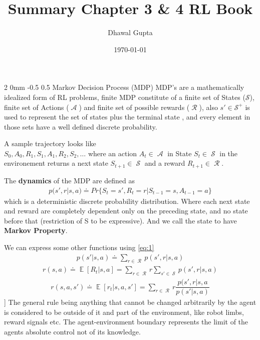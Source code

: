 \documentclass[twocolumn,11pt]{article}
\title{Summary Chapter 3 \& 4 RL Book \cite{sutton2018reinforcement}}
\author{Dhawal Gupta}
\date{\today}
\makeatletter
\DeclareMathOperator{\E}{\mathbb{E}}
\DeclareMathOperator{\State}{\mathcal{S}}
\DeclareMathOperator{\Action}{\mathcal{A}}
\DeclareMathOperator{\Reward}{\mathcal{R}}
\renewcommand{\section}{\@startsection
{section}%
{2}%
{0mm}%
{-0.5\baselineskip}%
{0.5\baselineskip}%
{\bfseries\color{blue}}} %
\makeatother
\begin{document}
\maketitle

\section{Markov Decision Process (MDP)}
MDP's are a mathematically idealized form of RL problems, finite MDP constitute of a finite set of States ($\mathcal{S}$),  finite set of Actions ($\Action$) and finite set of possible rewards ($\Reward$), also $s' \in \mathcal{S}^+$ is used to represent the set of states plus the terminal state , and every element in those sets have a well defined discrete probability. 

A sample trajectory looks like\\
$S_0, A_0, R_1, S_1, A_1, R_2, S_2, \ldots$ where an action $A_t \in \Action$ in State $S_t \in  \State$ in the environement returns a next state $S_{t+1} \in \State$ and a reward $R_{t+1} \in \Reward$.

The \textbf{dynamics} of the MDP are defined as 
\begin{align}\label{eq:1}
    p(s',r|s,a) \doteq Pr\{S_t= s', R_t = r | S_{t-1} = s, A_{t-1} = a\}
\end{align}
which is a deterministic discrete probability distribution. Where each next state and reward are completely dependent only on the preceding state, and no state before that (restriction of S to be expressive). And we call the state to have \textbf{Markov Property}. 

We can express some other functions using \ref{eq:1}\useshortskip
\begin{align}\label{eq:2}
    p(s'|s,a) \doteq \sum_{r \in \Reward}p(s', r|s, a)
\end{align}\useshortskip
\begin{align}\label{eq:3}
    r(s,a) \doteq \E[R_t | s, a] = \sum_{r \in \Reward} r \sum_{s' \in \State} p(s',r|s,a)
\end{align}\useshortskip
\begin{align}\label{eq:4}
    r(s,a,s') \doteq \E[r_t| s,a, s'] = \sum_{r \in \Reward} r \dfrac{p(s',r|s,a}{p(s'|s,a)}
\end{align}]\useshortskip
The general rule being anything that cannot be changed arbitrarily by the agent is considered to be outside of it and part of the environment, like robot limbs,  reward signals etc. The agent-environment boundary represents the limit of the agents absolute control not of its knowledge.
\end{document}
